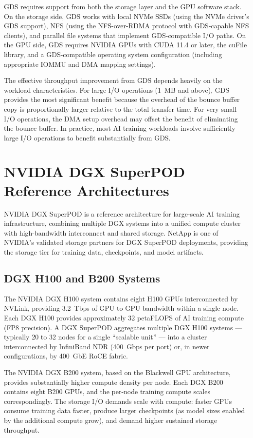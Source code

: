 GDS requires support from both the storage layer and the GPU software stack.
On the storage side, GDS works with local NVMe SSDs (using the NVMe driver's
GDS support), NFS (using the NFS-over-RDMA protocol with GDS-capable NFS
clients), and parallel file systems that implement GDS-compatible I/O paths.
On the GPU side, GDS requires NVIDIA GPUs with CUDA 11.4 or later, the cuFile
library, and a GDS-compatible operating system configuration (including
appropriate IOMMU and DMA mapping settings).

The effective throughput improvement from GDS depends heavily on the workload
characteristics. For large I/O operations (1~MB and above), GDS provides the
most significant benefit because the overhead of the bounce buffer copy is
proportionally larger relative to the total transfer time. For very small I/O
operations, the DMA setup overhead may offset the benefit of eliminating the
bounce buffer. In practice, most AI training workloads involve sufficiently
large I/O operations to benefit substantially from GDS.

\section{NVIDIA DGX SuperPOD Reference Architectures}

NVIDIA DGX SuperPOD is a reference architecture for large-scale AI training
infrastructure, combining multiple DGX systems into a unified compute cluster
with high-bandwidth interconnect and shared storage. NetApp is one of NVIDIA's
validated storage partners for DGX SuperPOD deployments, providing the storage
tier for training data, checkpoints, and model artifacts.

\subsection{DGX H100 and B200 Systems}

The NVIDIA DGX H100 system contains eight H100 GPUs interconnected by NVLink,
providing 3.2~Tbps of GPU-to-GPU bandwidth within a single node. Each DGX
H100 provides approximately 32 petaFLOPS of AI training compute (FP8
precision). A DGX SuperPOD aggregates multiple DGX H100 systems --- typically
20 to 32 nodes for a single ``scalable unit'' --- into a cluster
interconnected by InfiniBand NDR (400~Gbps per port) or, in newer
configurations, by 400~GbE RoCE fabric.

The NVIDIA DGX B200 system, based on the Blackwell GPU architecture, provides
substantially higher compute density per node. Each DGX B200 contains eight
B200 GPUs, and the per-node training compute scales correspondingly. The
storage I/O demands scale with compute: faster GPUs consume training data
faster, produce larger checkpoints (as model sizes enabled by the additional
compute grow), and demand higher sustained storage throughput.

